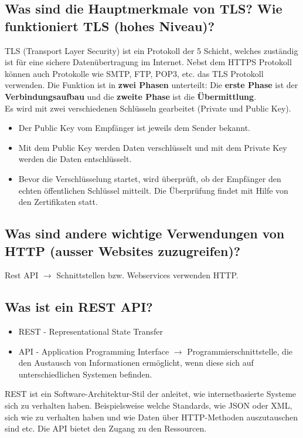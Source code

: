 \subsection*{Was sind die Hauptmerkmale von TLS? Wie funktioniert TLS (hohes Niveau)?}
TLS (Transport Layer Security) ist ein Protokoll der 5 Schicht, welches zuständig ist für eine sichere Datenübertragung im Internet. Nebst dem HTTPS Protokoll können auch Protokolle wie SMTP, FTP, POP3, etc. das TLS Protokoll verwenden. Die Funktion ist in \textbf{zwei Phasen} unterteilt: Die \textbf{erste Phase} ist der \textbf{Verbindungsaufbau} und die \textbf{zweite Phase} ist die \textbf{Übermittlung}.\\[1em]

Es wird mit zwei verschiedenen Schlüsseln gearbeitet (Private und Public Key).
\begin{itemize}
    \item Der Public Key vom Empfänger ist jeweils dem Sender bekannt.
    \item Mit dem Public Key werden Daten verschlüsselt und mit dem Private Key werden die Daten entschlüsselt.
    \item Bevor die Verschlüsselung startet, wird überprüft, ob der Empfänger den echten öffentlichen Schlüssel mitteilt. Die Überprüfung findet mit Hilfe von den Zertifikaten statt.
\end{itemize}

\subsection*{Was sind andere wichtige Verwendungen von HTTP (ausser Websites zuzugreifen)?}
Rest API $\rightarrow$ Schnittstellen bzw. Webservices verwenden HTTP.

\subsection*{Was ist ein REST API?}
\begin{itemize}
    \item REST - Representational State Transfer
    \item API - Application Programming Interface $\rightarrow$ Programmierschnittstelle, die den Austausch von Informationen ermöglicht, wenn diese sich auf unterschiedlichen Systemen befinden.
\end{itemize}
REST ist ein Software-Architektur-Stil der anleitet, wie internetbasierte Systeme sich zu verhalten haben. Beispielsweise welche Standards, wie JSON oder XML, sich wie zu verhalten haben und wie Daten über HTTP-Methoden auszutauschen sind etc. Die API bietet den Zugang zu den Ressourcen.

